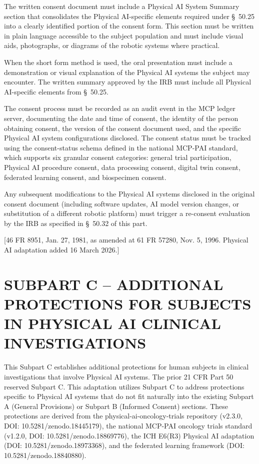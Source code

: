 \documentclass[11pt]{article}
\begin{document}
\begin{description}[leftmargin=1.0cm,style=sameline]
\item[(1)] The written consent document must include a Physical AI System Summary section that consolidates the Physical AI-specific elements required under \S~50.25 into a clearly identified portion of the consent form. This section must be written in plain language accessible to the subject population and must include visual aids, photographs, or diagrams of the robotic systems where practical.
\item[(2)] When the short form method is used, the oral presentation must include a demonstration or visual explanation of the Physical AI systems the subject may encounter. The written summary approved by the IRB must include all Physical AI-specific elements from \S~50.25.
\item[(3)] The consent process must be recorded as an audit event in the MCP ledger server, documenting the date and time of consent, the identity of the person obtaining consent, the version of the consent document used, and the specific Physical AI system configurations disclosed. The consent status must be tracked using the consent-status schema defined in the national MCP-PAI standard, which supports six granular consent categories: general trial participation, Physical AI procedure consent, data processing consent, digital twin consent, federated learning consent, and biospecimen consent.
\item[(4)] Any subsequent modifications to the Physical AI systems disclosed in the original consent document (including software updates, AI model version changes, or substitution of a different robotic platform) must trigger a re-consent evaluation by the IRB as specified in \S~50.32 of this part.
\end{description}

[46 FR 8951, Jan. 27, 1981, as amended at 61 FR 57280, Nov. 5, 1996. Physical AI adaptation added 16 March 2026.]

\section{SUBPART C -- ADDITIONAL PROTECTIONS FOR SUBJECTS IN PHYSICAL AI CLINICAL INVESTIGATIONS}

This Subpart C establishes additional protections for human subjects in clinical investigations that involve Physical AI systems. The prior 21 CFR Part 50 reserved Subpart C. This adaptation utilizes Subpart C to address protections specific to Physical AI systems that do not fit naturally into the existing Subpart A (General Provisions) or Subpart B (Informed Consent) sections. These protections are derived from the physical-ai-oncology-trials repository (v2.3.0, DOI: 10.5281/zenodo.18445179), the national MCP-PAI oncology trials standard (v1.2.0, DOI: 10.5281/zenodo.18869776), the ICH E6(R3) Physical AI adaptation (DOI: 10.5281/zenodo.18973368), and the federated learning framework (DOI: 10.5281/zenodo.18840880).
\end{document}
